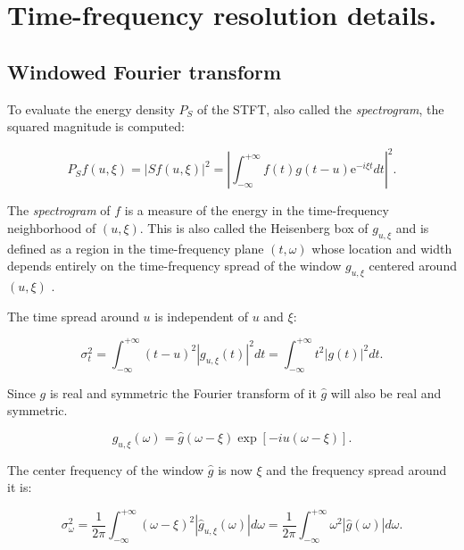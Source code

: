 \chapter{Time-frequency resolution details.}
\section{Windowed Fourier transform}\label{ap:TimeFreqResolutionFourier}
To evaluate the energy density $P_S$ of the STFT, also called the \emph{spectrogram}, the squared magnitude is computed:

\begin{equation}\label{eq:Mallat1999_3copy}
P_S f(u,\xi) = |S f(u,\xi)|^2 = \left| \int^{+\infty}_{-\infty} f(t)g(t-u)\mathrm{e}^{-i\xi t} dt \right|^2.
\end{equation}

The \emph{spectrogram} of $f$ is a measure of the energy in the time-frequency neighborhood of $(u,\xi)$. This is also called the Heisenberg box of $g_{u,\xi}$ and is defined as a region in the time-frequency plane $(t, \omega)$ whose location and width depends entirely on the time-frequency spread of the window $g_{u,\xi}$ centered around $(u,\xi)$ \cite{Mallat1999}.

The time spread around $u$ is independent of $u$ and $\xi$:

\begin{equation}\label{eq:Mallat1999_413}
\sigma^2_t = \int^{+\infty}_{-\infty} (t-u)^2 |g_{u,\xi}(t)|^2 dt = \int^{+\infty}_{-\infty} t^2 |g(t)|^2 dt.
\end{equation}

Since $g$ is real and symmetric the Fourier transform of it $\hat{g}$ will also be real and symmetric.

\begin{equation}\label{eq:Mallat1999_414}
\hat{g}_{u,\xi}(\omega) = \hat{g}(\omega - \xi) \exp{\left[ -iu(\omega - \xi)\right]}.
\end{equation}

The center frequency of the window $\hat{g}$ is now $\xi$ and the frequency spread around it is:

\begin{equation}\label{eq:Mallat1999_415}
\sigma^2_\omega = \frac{1}{2\pi} \int^{+\infty}_{-\infty} (\omega - \xi)^2 |\hat{g}_{u,\xi}(\omega)| d\omega = \frac{1}{2\pi} \int^{+\infty}_{-\infty} \omega^2 |\hat{g}(\omega)| d\omega.
\end{equation}

